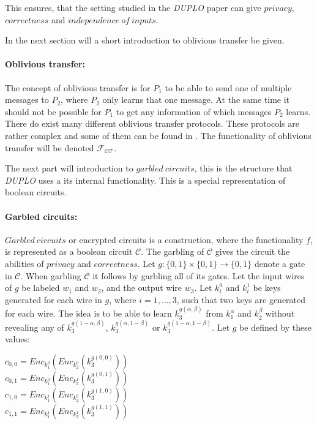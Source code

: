 \documentclass[twoside,11pt,openright]{report}
\newcommand{\DUPLO}{\textit{DUPLO} }
\begin{document}
This ensures, that the setting studied in the \DUPLO paper can give $privacy$, $correctness$ and $independence~of~inputs$.

\bigskip

In the next section will a short introduction to oblivious transfer be given.

\paragraph{Oblivious transfer:}
The concept of oblivious transfer is for $P_1$ to be able to send one of multiple messages to $P_2$, where $P_2$ only learns that one message. At the same time it should not be possible for $P_1$ to get any information of which messages $P_2$ learns. There do exist many different oblivious transfer protocols. These protocols are rather complex and some of them can be found in \cite{estpp}. The functionality of oblivious transfer will be denoted $\mathcal{F_{OT}}$.

\bigskip

The next part will introduction to $garbled~circuits$, this is the structure that \DUPLO uses a its internal functionality. This is a special representation of boolean circuits.

\paragraph{Garbled circuits:} 
$Garbled~circuits$ or encrypted circuits is a construction, where the functionality $f$, is represented as a boolean circuit $\mathcal{C}$. The garbling of $\mathcal{C}$ gives the circuit the abilities of $privacy$ and $correctness$. Let $g:\{0,1\}\times \{0,1\} \to \{0,1\}$ denote a gate in $\mathcal{C}$. When garbling $\mathcal{C}$ it follows by garbling all of its gates. Let the input wires of $g$ be labeled $w_1$ and $w_2$, and the output wire $w_3$. Let $k^0_i$ and $k^1_i$ be keys generated for each wire in $g$, where $i=1,\dots,3$, such that two keys are generated for each wire. The idea is to be able to learn $k^{g(\alpha,\beta)}_3$ from $k^\alpha_1$ and $k^\beta_2$ without revealing any of $k^{g(1-\alpha,\beta)}_3$, $k^{g(\alpha,1-\beta)}_3$ or $k^{g(1-\alpha,1-\beta)}_3$. Let $g$ be defined by these values:

\begin{center}
    $c_{0,0} = Enc_{k^0_1}(Enc_{k^0_2}(k^{g(0,0)}_3))$    \\
    $c_{0,1} = Enc_{k^0_1}(Enc_{k^1_2}(k^{g(0,1)}_3))$    \\
    $c_{1,0} = Enc_{k^1_1}(Enc_{k^0_2}(k^{g(1,0)}_3))$    \\
    $c_{1,1} = Enc_{k^1_1}(Enc_{k^1_2}(k^{g(1,1)}_3))$    \\
\end{center}
\end{document}
